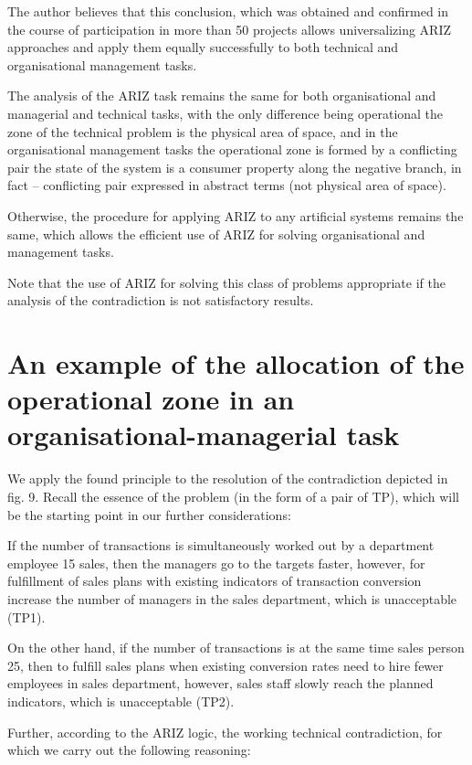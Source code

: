 \documentclass[11pt,a4paper]{book}
\begin{document}
The author believes that this conclusion, which was obtained and confirmed in
the course of participation in more than 50 projects allows universalizing
ARIZ approaches and apply them equally successfully to both technical and
organisational management tasks.

The analysis of the ARIZ task remains the same for both organisational and
managerial and technical tasks, with the only difference being operational the
zone of the technical problem is the physical area of space, and in the
organisational management tasks the operational zone is formed by a
conflicting pair the state of the system is a consumer property along the
negative branch, in fact -- conflicting pair expressed in abstract terms (not
physical area of space).

Otherwise, the procedure for applying ARIZ to any artificial systems remains
the same, which allows the efficient use of ARIZ for solving organisational
and management tasks.

Note that the use of ARIZ for solving this class of problems appropriate if
the analysis of the contradiction is not satisfactory results.

\section{An example of the allocation of the operational zone in an
  organisational-managerial task}

We apply the found principle to the resolution of the contradiction depicted
in fig. 9. Recall the essence of the problem (in the form of a pair of TP),
which will be the starting point in our further considerations:

If the number of transactions is simultaneously worked out by a department
employee 15 sales, then the managers go to the targets faster, however, for
fulfillment of sales plans with existing indicators of transaction conversion
increase the number of managers in the sales department, which is unacceptable
(TP1).

On the other hand, if the number of transactions is at the same time sales
person 25, then to fulfill sales plans when existing conversion rates need to
hire fewer employees in sales department, however, sales staff slowly reach
the planned indicators, which is unacceptable (TP2).

Further, according to the ARIZ logic, the working technical contradiction, for
which we carry out the following reasoning:
\end{document}
